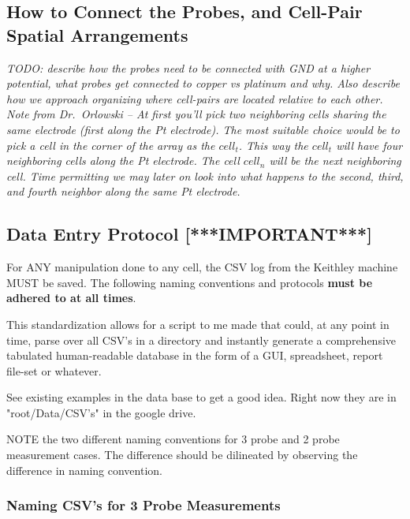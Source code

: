 \documentclass{article}
\begin{document}
      \subsection{How to Connect the Probes, and Cell-Pair Spatial Arrangements}

        \textit{TODO: describe how the probes need to be connected with GND at a higher potential, what probes get
        connected to copper vs platinum and why. Also describe how we approach organizing where cell-pairs are located
        relative to each other. Note from Dr.\ Orlowski -- At first you'll pick two neighboring cells sharing the same
        electrode (first along the Pt electrode). The most suitable choice would be to pick a cell in the corner of the
        array as the $cell_t$. This way the $cell_t$ will have four neighboring cells along the Pt electrode. The cell
        $cell_n$ will be the next neighboring cell. Time permitting we may later on look into what happens to the
        second, third, and fourth neighbor along the same Pt electrode.}
      
      \newpage
      \subsection{Data Entry Protocol [***IMPORTANT***]}
        
        For ANY manipulation done to any cell, the CSV log from the Keithley machine MUST be saved. The following naming
        conventions and protocols \textbf{must be adhered to at all times}.

        This standardization allows for a script to me made that could, at any point in time, parse over all CSV's in a
        directory and instantly generate a comprehensive tabulated human-readable database in the form of a GUI,
        spreadsheet, report file-set or whatever.

        See existing examples in the data base to get a good idea. Right now they are in "root/Data/CSV's" in the google
        drive.

        NOTE the two different naming conventions for 3 probe and 2 probe measurement cases. The difference should be
        dilineated by observing the difference in naming convention.

        \subsubsection{Naming CSV's for 3 Probe Measurements}
\end{document}
